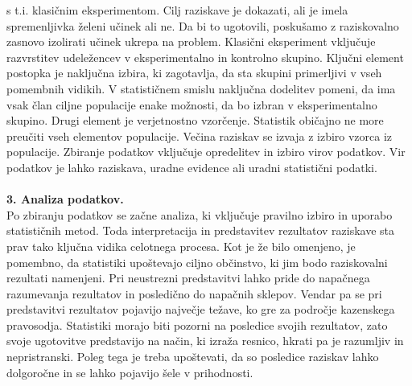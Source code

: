 \documentclass[fin1, tisk]{fmfdelo}
\theoremstyle{definition}
\theoremstyle{trditev}
\theoremstyle{izrek}
\begin{document}
s t.i. klasičnim eksperimentom. Cilj raziskave je dokazati, ali je imela spremenljivka želeni učinek ali ne. Da bi to ugotovili, poskušamo z 
raziskovalno zasnovo izolirati učinek ukrepa na problem. Klasični eksperiment vključuje razvrstitev udeležencev v eksperimentalno in kontrolno 
skupino. Ključni element postopka je naključna izbira, ki zagotavlja, da sta skupini primerljivi v vseh pomembnih vidikih. V statističnem smislu 
naključna dodelitev pomeni, da ima vsak član ciljne populacije enake možnosti, da bo izbran v eksperimentalno skupino. Drugi element je verjetnostno 
vzorčenje. Statistik običajno ne more preučiti vseh elementov populacije. Večina raziskav se izvaja z izbiro vzorca iz populacije. 
Zbiranje podatkov vključuje opredelitev in izbiro virov podatkov. Vir podatkov je lahko raziskava, uradne evidence ali uradni statistični podatki.\\\\
\textbf{3. Analiza podatkov.\\}
Po zbiranju podatkov se začne analiza, ki vključuje pravilno izbiro in uporabo statističnih metod. Toda interpretacija in predstavitev rezultatov raziskave 
sta prav tako ključna vidika celotnega procesa. Kot je že bilo omenjeno, je pomembno, da statistiki upoštevajo ciljno občinstvo, ki jim bodo 
raziskovalni rezultati namenjeni. Pri neustrezni predstavitvi lahko pride do napačnega razumevanja rezultatov in posledično do napačnih sklepov. Vendar pa 
se pri predstavitvi rezultatov pojavijo največje težave, ko gre za področje kazenskega pravosodja. Statistiki morajo biti pozorni na 
posledice svojih rezultatov, zato svoje ugotovitve predstavijo na način, ki izraža resnico, hkrati pa je razumljiv in nepristranski. Poleg tega je 
treba upoštevati, da so posledice raziskav lahko dolgoročne in se lahko pojavijo šele v prihodnosti.

\end{document}
